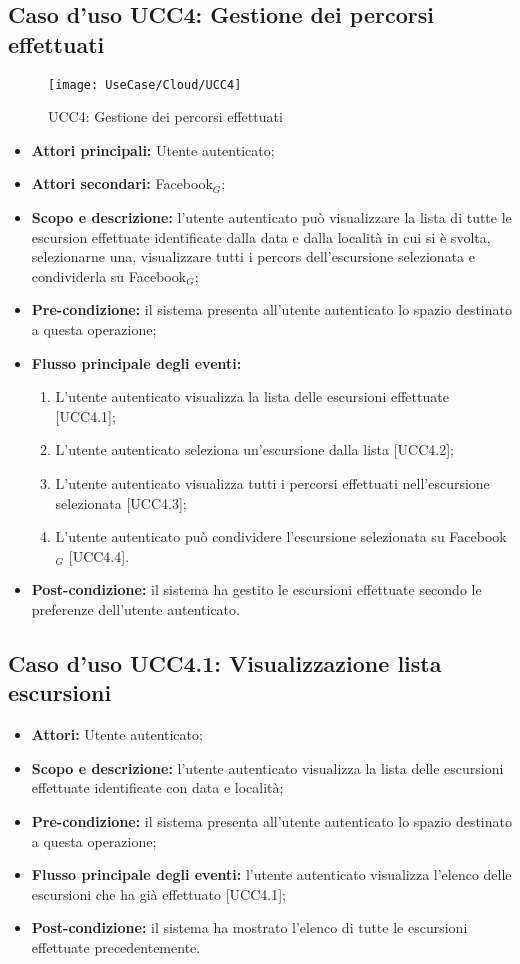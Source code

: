 \subsection{Caso d'uso UCC4: Gestione dei percorsi effettuati}

\begin{figure}[H]
\centering
\texttt{[image: UseCase/Cloud/UCC4]}
\caption{UCC4: Gestione dei percorsi effettuati}
\end{figure}

\begin{itemize}
\item \textbf{Attori principali:} Utente autenticato;
\item \textbf{Attori secondari:} Facebook$_{G}$;
\item \textbf{Scopo e descrizione:} l'utente autenticato può visualizzare la lista di tutte le escursion effettuate identificate dalla data e dalla località in cui si è svolta, selezionarne una, visualizzare tutti i percors dell'escursione selezionata e condividerla su Facebook$_{G}$;
\item \textbf{Pre-condizione:} il sistema presenta all'utente autenticato lo spazio destinato a questa operazione;
\item \textbf{Flusso principale degli eventi:}
\begin{enumerate}
\item L'utente autenticato visualizza la lista delle escursioni effettuate [UCC4.1];
\item L'utente autenticato seleziona un'escursione dalla lista [UCC4.2];
\item L'utente autenticato visualizza tutti i percorsi effettuati nell'escursione selezionata [UCC4.3];
\item L'utente autenticato può condividere l'escursione selezionata su Facebook$_{G}$ [UCC4.4].
\end{enumerate}
\item \textbf{Post-condizione:} il sistema ha gestito le escursioni effettuate secondo le preferenze dell'utente autenticato.
\end{itemize}

\subsection{Caso d'uso UCC4.1: Visualizzazione lista escursioni}

\begin{itemize}
\item \textbf{Attori:} Utente autenticato;
\item \textbf{Scopo e descrizione:} l'utente autenticato visualizza la lista delle escursioni effettuate identificate con data e località;
\item \textbf{Pre-condizione:} il sistema presenta all'utente autenticato lo spazio destinato a questa operazione;
\item \textbf{Flusso principale degli eventi:} l'utente autenticato visualizza l'elenco delle escursioni che ha già effettuato [UCC4.1];
\item \textbf{Post-condizione:} il sistema ha mostrato l'elenco di tutte le escursioni effettuate precedentemente.
\end{itemize}

